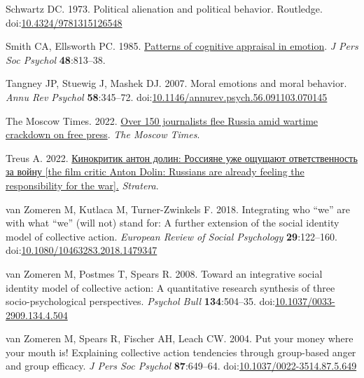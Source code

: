 \documentclass[
]{article}
\newlength{\cslhangindent}
\newenvironment{CSLReferences}[2] %
 {\begin{list}{}{%
  \setlength{\itemindent}{0pt}
  \setlength{\leftmargin}{0pt}
  \setlength{\parsep}{0pt}
  \ifodd #1
   \setlength{\leftmargin}{\cslhangindent}
   \setlength{\itemindent}{-1\cslhangindent}
  \fi
  \setlength{\itemsep}{#2\baselineskip}}}
 {\end{list}}
\begin{document}
\begin{CSLReferences}{1}{0}
Schwartz DC. 1973. Political alienation and political behavior. Routledge. doi:\href{https://doi.org/10.4324/9781315126548}{10.4324/9781315126548}

Smith CA, Ellsworth PC. 1985. \href{https://www.ncbi.nlm.nih.gov/pubmed/3886875}{Patterns of cognitive appraisal in emotion}. \emph{J Pers Soc Psychol} \textbf{48}:813--38.

Tangney JP, Stuewig J, Mashek DJ. 2007. Moral emotions and moral behavior. \emph{Annu Rev Psychol} \textbf{58}:345--72. doi:\href{https://doi.org/10.1146/annurev.psych.56.091103.070145}{10.1146/annurev.psych.56.091103.070145}

The Moscow Times. 2022. \href{https://www.themoscowtimes.com/2022/03/07/over-150-journalists-flee-russia-amid-wartime-crackdown-on-free-press-reports-a76809\%20on\%2030.03.2023}{Over 150 journalists flee {Russia} amid wartime crackdown on free press}. \emph{The Moscow Times}.

Treus A. 2022. \href{https://aussiedlerbote.de/2022/11/kinokritik-anton-dolin-rossiyane-uzhe-oshhushhayut-otvetstvennost-za-vojnu/}{Кинокритик антон долин: Россияне уже ощущают ответственность за войну {[}the film critic {Anton Dolin}: Russians are already feeling the responsibility for the war{]}.} \emph{Stratera}.

van Zomeren M, Kutlaca M, Turner-Zwinkels F. 2018. Integrating who {``}we{''} are with what {``}we{''} (will not) stand for: A further extension of the social identity model of collective action. \emph{European Review of Social Psychology} \textbf{29}:122--160. doi:\href{https://doi.org/10.1080/10463283.2018.1479347}{10.1080/10463283.2018.1479347}

van Zomeren M, Postmes T, Spears R. 2008. Toward an integrative social identity model of collective action: A quantitative research synthesis of three socio-psychological perspectives. \emph{Psychol Bull} \textbf{134}:504--35. doi:\href{https://doi.org/10.1037/0033-2909.134.4.504}{10.1037/0033-2909.134.4.504}

van Zomeren M, Spears R, Fischer AH, Leach CW. 2004. Put your money where your mouth is! Explaining collective action tendencies through group-based anger and group efficacy. \emph{J Pers Soc Psychol} \textbf{87}:649--64. doi:\href{https://doi.org/10.1037/0022-3514.87.5.649}{10.1037/0022-3514.87.5.649}


\end{CSLReferences}
\end{document}
